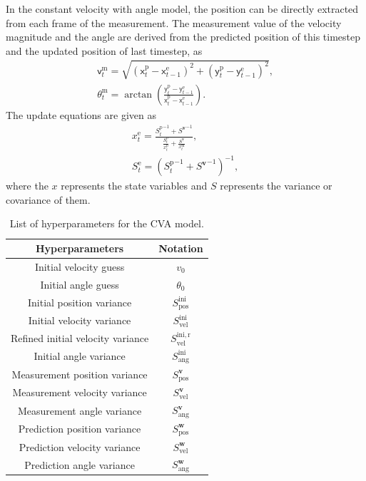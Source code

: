 In the constant velocity with angle model, the position can be directly extracted from each frame of the measurement. The measurement value of the velocity magnitude and the angle are derived from the predicted position of this timestep and the updated position of last timestep, as
\begin{gather}
    \mathsf{v}_{t}^{\mathrm{m}}=\sqrt{(\mathsf{x}_{t}^{\mathrm{p}}-\mathsf{x}_{t-1}^{\mathrm{e}})^{2}+(\mathsf{y}_{t}^{\mathrm{p}}-\mathsf{y}_{t-1}^{\mathrm{e}})^{2}},\\
    \theta_{t}^{\mathrm{m}}=\arctan(\frac{\mathsf{y}_{t}^{\mathrm{p}}-\mathsf{y}_{t-1}^{\mathrm{e}}}{\mathsf{x}_{t}^{\mathrm{p}}-\mathsf{x}_{t-1}^{\mathrm{e}}}).
\end{gather}
The update equations are given as
\begin{gather}
    x^{\mathrm{e}}_{t}=\frac{{S_{t}^{\mathrm{p}}}^{-1}+{S^{\boldsymbol{v}}}^{-1}}{\frac{S_{t}^{\mathrm{p}}}{x_{t}^{\mathrm{p}}}+\frac{S^{\underline{\boldsymbol{v}}}}{x_{t}^{\mathrm{m}}}},\\
    S_{t}^{\mathrm{e}}=({{S_{t}^{\mathrm{p}}}^{-1}+{S^{\boldsymbol{v}}}^{-1}})^{-1},
\end{gather}
where the $x$ represents the state variables and $S$ represents the variance or covariance of them.

\begin{table}[htbp] 
    \centering
    \caption{List of hyperparameters for the CVA model.} 
    \begin{tabular}{cc} 
    \toprule 
    Hyperparameters&Notation\\ 
    \midrule 
    Initial velocity guess&$v_{0}$\\
    Initial angle guess&$\theta_{0}$\\
    Initial position variance         &$S_{\mathrm{pos}}^{\mathrm{ini}}$\\
    Initial velocity variance           &$S_{\mathrm{vel}}^{\mathrm{ini}}$\\
    Refined initial velocity variance&$S_{\mathrm{vel}}^{\mathrm{ini, r}}$\\
    Initial angle variance          &$S_{\mathrm{ang}}^{\mathrm{ini}}$\\
    Measurement position variance   &$S_{\mathrm{pos}}^{\boldsymbol{v}}$\\
    Measurement velocity variance   &$S_{\mathrm{vel}}^{\boldsymbol{v}}$\\
    Measurement angle variance      &$S_{\mathrm{ang}}^{\boldsymbol{v}}$\\
    Prediction position variance    &$S_{\mathrm{pos}}^{\boldsymbol{w}}$\\
    Prediction velocity variance    &$S_{\mathrm{vel}}^{\boldsymbol{w}}$\\
    Prediction angle variance       &$S_{\mathrm{ang}}^{\boldsymbol{w}}$\\
    \bottomrule 
    \end{tabular} 
    \label{list HP cva}
\end{table}


